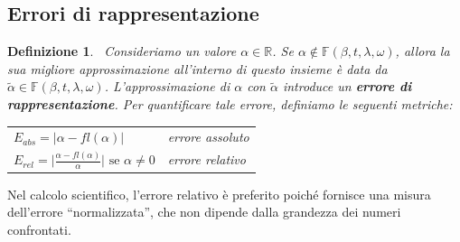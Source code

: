 \documentclass{article}
\newtheorem*{definition}{\color{red}\textbf{Definizione}}
\begin{document}
\subsection{Errori di rappresentazione}
\begin{definition}\leavevmode\
    Consideriamo un valore $\alpha\in \mathbb{R}$. Se $\alpha\notin
    \mathbb{F}(\beta,t,\lambda,\omega)$, allora la sua migliore
    approssimazione all'interno di questo insieme è data da $\tilde\alpha\in
    \mathbb{F}(\beta,t,\lambda,\omega)$. L'approssimazione di $\alpha$ con
    $\tilde\alpha$ introduce un \textbf{errore di rappresentazione}. Per quantificare
    tale errore, definiamo le seguenti metriche:
    {
        \renewcommand{\arraystretch}{1.5}
        \begin{center}
           \begin{tabular}{ll}
                $E_{abs}=\lvert \alpha-fl(\alpha)\rvert$ & errore assoluto \\
                $E_{rel}=\lvert \frac{\alpha-fl(\alpha)}{\alpha}\rvert\text{ se
            }\alpha\neq0$ & errore relativo 
           \end{tabular}
        \end{center}
    }
\end{definition}
Nel calcolo scientifico, l'errore relativo è preferito poiché fornisce una
misura dell'errore ``normalizzata'', che non dipende dalla grandezza dei numeri confrontati.
\end{document}
